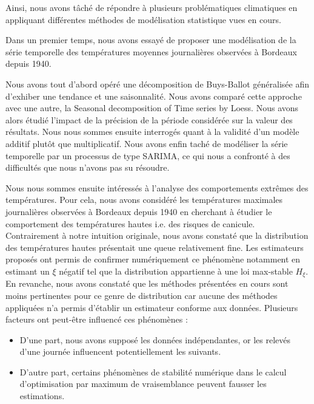 \documentclass[../report.tex]{subfiles}
\begin{document}
\par Ainsi, nous avons tâché de répondre à plusieurs problématiques climatiques en appliquant différentes méthodes de modélisation statistique vues en cours.

\vspace{5mm}
\par Dans un premier temps, nous avons essayé de proposer une modélisation de la série temporelle des températures moyennes journalières observées à Bordeaux depuis 1940.
\par Nous avons tout d'abord opéré une décomposition de Buys-Ballot généralisée afin d'exhiber une tendance et une saisonnalité. Nous avons comparé cette approche avec une autre, la Seasonal decomposition of Time series by Loess. Nous avons alors étudié l'impact de la précision de la période considérée sur la valeur des résultats. Nous nous sommes ensuite interrogés quant à la validité d'un modèle additif plutôt que multiplicatif. Nous avons enfin taché de modéliser la série temporelle par un processus de type SARIMA, ce qui nous a confronté à des difficultés que nous n'avons pas su résoudre.

\vspace{5mm}
\par Nous nous sommes ensuite intéressés à l'analyse des comportements extrêmes des températures. Pour cela, nous avons considéré les températures maximales journalières observées à Bordeaux depuis 1940 en cherchant à étudier le comportement des températures hautes i.e. des risques de canicule. Contrairement à notre intuition originale, nous avons constaté que la distribution des températures hautes présentait une queue relativement fine. Les estimateurs proposés ont permis de confirmer numériquement ce phénomène notamment en estimant un $\xi$ négatif tel que la distribution appartienne à une loi max-stable $H_{\xi}$. En revanche, nous avons constaté que les méthodes présentées en cours sont moins pertinentes pour ce genre de distribution car aucune des méthodes appliquées n'a permis d'établir un estimateur conforme aux données. Plusieurs facteurs ont peut-être influencé ces phénomènes : 
\begin{itemize}
\item D'une part, nous avons supposé les données indépendantes, or les relevés d'une journée influencent potentiellement les suivants.
\item D'autre part, certains phénomènes de stabilité numérique dans le calcul d'optimisation par maximum de vraisemblance peuvent fausser les estimations.
\end{itemize}
\end{document}
